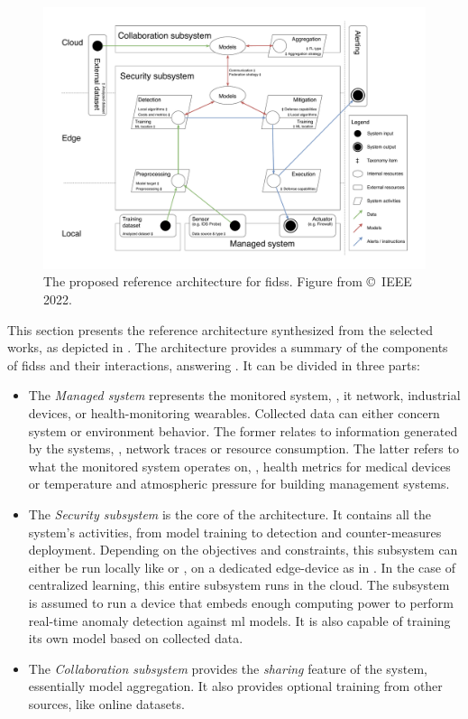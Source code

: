 \begin{figure}
  \centering
  \includegraphics[width=.95\textwidth]{figures/architecture.drawio.pdf}
  \caption[
    The proposed reference architecture for \glspl{fids}.
  ]{
    The proposed reference architecture for \glspl{fids}.
    Figure from \textcite{lavaur_EvolutionFederatedLearningbased_2022} \copyright~IEEE 2022.
    \label{fig:sota.archi}
  }
\end{figure}

This section presents the reference architecture synthesized from the selected works, as depicted in .
The architecture provides a summary of the components of \glspl{fids} and their interactions, answering .
It can be divided in three parts:
\begin{itemize}
  \item The \emph{Managed system} represents the monitored system, \eg, \gls{it} network, industrial devices, or health-monitoring wearables.
  Collected data can either concern system or environment behavior.
  The former relates to information generated by the systems, \eg, network traces or resource consumption.
  The latter refers to what the monitored system operates on, \eg, health metrics for medical devices or temperature and atmospheric pressure for building management systems.
  
  \item The \emph{Security subsystem} is the core of the architecture.
  It contains all the system's activities, from model training to detection and counter-measures deployment.
  Depending on the objectives and constraints, this subsystem can either be run locally like \cite{pahl_AllEyesYou_2018} or \cite{hei_trustedfeatureaggregator_2020}, on a dedicated edge-device as in \cite{li_DeepFedFederatedDeep_2020}.
  In the case of centralized learning, this entire subsystem runs in the cloud.
  The subsystem is assumed to run a device that embeds enough computing power to perform real-time anomaly detection against \gls{ml} models.
  It is also capable of training its own model based on collected data.

  \item The \emph{Collaboration subsystem} provides the \emph{sharing} feature of the system, essentially model aggregation.
  It also provides optional training from other sources, like online datasets.
\end{itemize}

